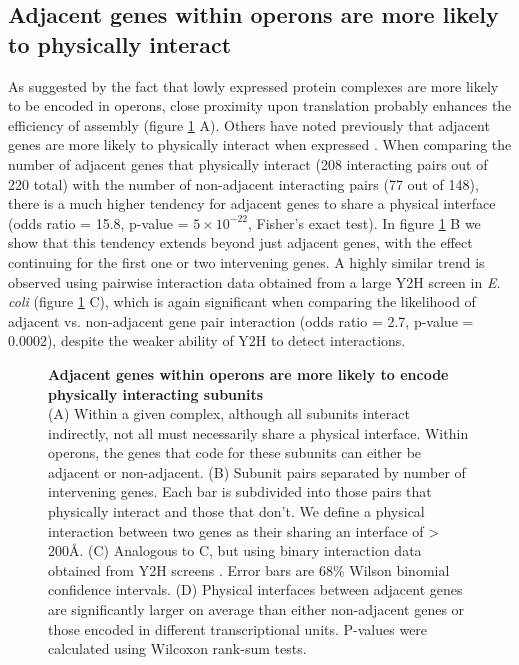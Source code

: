 \documentclass[a4paper,11pt,twoside,openright]{scrbook}
\begin{document}
\subsection{Adjacent genes within operons are more likely to physically interact}
As suggested by the fact that lowly expressed protein complexes are more likely to be encoded in operons, close proximity upon translation probably enhances the efficiency of assembly (figure \ref{figure:intervening} A). Others have noted previously that adjacent genes are more likely to physically interact when expressed \cite{}. When comparing the number of adjacent genes that physically interact (208 interacting pairs out of 220 total) with the number of non-adjacent interacting pairs (77 out of 148), there is a much higher tendency for adjacent genes to share a physical interface (odds ratio = 15.8, p-value = \(5\times10^{-22}\), Fisher's exact test). In figure \ref{figure:intervening} B we show that this tendency extends beyond just adjacent genes, with the effect continuing for the first one or two intervening genes. A highly similar trend is observed using pairwise interaction data obtained from a large Y2H screen in \textit{E. coli} \cite{Rajagopala2014} (figure \ref{figure:intervening} C), which is again significant when comparing the likelihood of adjacent vs. non-adjacent gene pair interaction (odds ratio = 2.7, p-value = 0.0002), despite the weaker ability of Y2H to detect interactions.

\begin{figure}[h]
    \caption[Adjacent genes within operons are more likely to encode physically interacting subunits]{\sffamily \textbf{Adjacent genes within operons are more likely to encode physically interacting subunits} \\ \small (A) Within a given complex, although all subunits interact indirectly, not all must necessarily share a physical interface. Within operons, the genes that code for these subunits can either be adjacent or non-adjacent. (B) Subunit pairs separated by number of intervening genes. Each bar is subdivided into those pairs that physically interact and those that don't. We define a physical interaction between two genes as their sharing an interface of > 200Å. (C) Analogous to C, but using binary interaction data obtained from Y2H screens \cite{Rajagopala2014}. Error bars are 68\% Wilson binomial confidence intervals. (D) Physical interfaces between adjacent genes are significantly larger on average than either non-adjacent genes or those encoded in different transcriptional units. P-values were calculated using Wilcoxon rank-sum tests.}
    \label{figure:intervening}
\end{figure}
\end{document}
